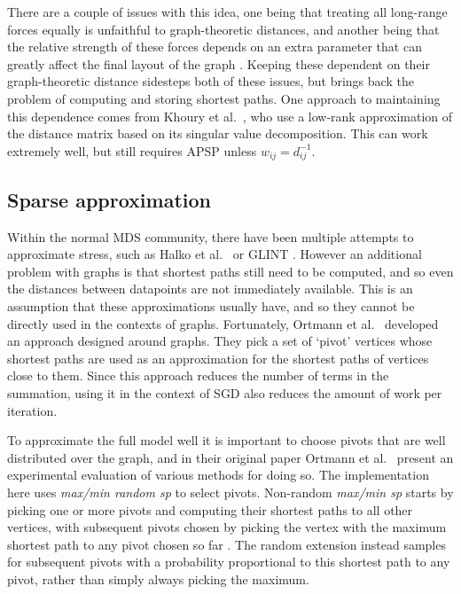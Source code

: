 There are a couple of issues with this idea, one being that treating all long-range forces equally is unfaithful to
graph-theoretic distances,
and another being that the relative strength of these forces depends on an extra parameter that can greatly affect the final layout of the graph \cite{Hu2005}.
Keeping these dependent on their graph-theoretic distance sidesteps both of these issues, but brings back the problem of computing and storing shortest paths. One approach to maintaining this dependence comes from Khoury et al.\ \cite{Khoury2012}, who use a low-rank approximation of the distance matrix based on its singular value decomposition. This can work extremely well,
but still requires APSP unless $w_{ij} = d_{ij}^{-1}$.

\subsection{Sparse approximation}
\label{sec:sparse_explanation}
Within the normal MDS community, there have been multiple attempts to approximate stress, such as Halko et al.\ \cite{Halko2011} or GLINT \cite{Ingram2012}. However an additional problem with graphs is that shortest paths still need to be computed, and so even the distances between datapoints are not immediately available. This is an assumption that these approximations usually have, and so they cannot be directly used in the contexts of graphs.
Fortunately, Ortmann et al.\ \cite{Ortmann2017} developed an approach designed around graphs. They pick a set of `pivot' vertices whose shortest paths are used as an approximation for the shortest paths of vertices close to them.
Since this approach reduces the number of terms in the summation, using it in the context of SGD also reduces the amount of work per iteration.

To approximate the full model well it is important to choose pivots that are well distributed over the graph, and in their original paper Ortmann et al.\ \cite{Ortmann2017} present an experimental evaluation of various methods for doing so. The implementation here uses \textit{max/min random sp} to select pivots.
Non-random \textit{max/min sp} starts by picking one or more pivots and computing their shortest paths to all other vertices, with subsequent pivots chosen by picking the vertex with the maximum shortest path to any pivot chosen so far \cite{DeSilva2004}. The random extension instead samples for subsequent pivots with a probability proportional to this shortest path to any pivot, rather than simply always picking the maximum.

